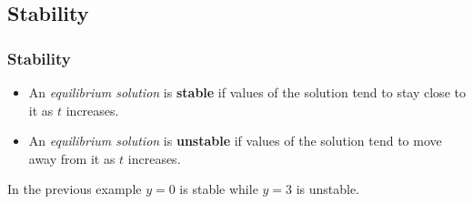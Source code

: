 \subsection{Stability}

\begin{frame}
  \frametitle{Stability}

  \begin{itemize}
  \item An \textit{equilibrium solution} is {\color{red}\textbf{stable}} if values
    of the solution tend to stay close to it as $t$ increases.
  \item An \textit{equilibrium solution} is {\color{red}\textbf{unstable}} if
    values of the solution tend to move away from it as $t$ increases.
  \end{itemize}

  In the previous example $y=0$ is stable while $y=3$ is unstable.

\end{frame}



